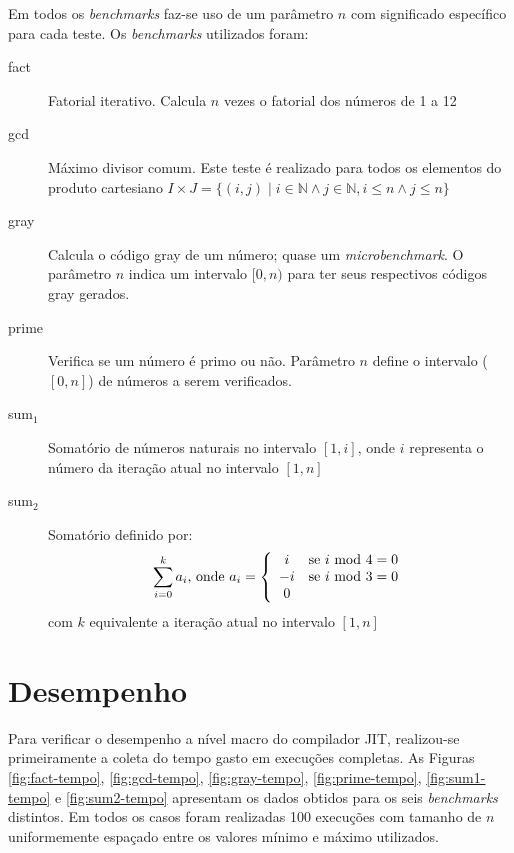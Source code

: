 Em todos os \textit{benchmarks} faz-se uso de um parâmetro $n$ com
significado específico para cada teste. Os \textit{benchmarks}
utilizados foram:

\begin{description}
\item[fact] Fatorial iterativo. Calcula $n$ vezes o fatorial dos
  números de 1 a 12
\item[gcd] Máximo divisor comum. Este teste é realizado
  para todos os elementos do produto cartesiano
 $I \times J = \{(i, j) \mid i \in \mathbb{N} \wedge j \in \mathbb{N},
 i \le n \wedge j \le n\}$
\item[gray] Calcula o código gray \cite{graycode} de um número;
  quase um \textit{microbenchmark}. O parâmetro $n$ indica um
  intervalo $[0, n)$ para ter seus respectivos códigos gray gerados.
\item[prime] Verifica se um número é primo ou não. Parâmetro $n$
  define o intervalo ($[0, n]$) de números a serem verificados.
\item[sum$_1$] Somatório de números naturais no intervalo
 $[1, i]$, onde $i$ representa o número da iteração atual no intervalo
 $[1, n]$
\item[sum$_2$] Somatório definido por:
\[ \sum_{i=0}^k a_i\mbox{, onde } a_i = \left\{
    \begin{array}{c l}
      i & \mbox{se } i \mbox{ mod } 4 = 0 \\
      -i & \mbox{se } i \mbox{ mod } 3 = 0 \\
      0
    \end{array}
  \right.
\] com $k$ equivalente a iteração atual no intervalo $[1, n]$
\end{description}


\section{Desempenho}

Para verificar o desempenho a nível macro do compilador JIT,
realizou-se primeiramente a coleta do tempo gasto em execuções
completas. As Figuras
\ref{fig:fact-tempo}, \ref{fig:gcd-tempo}, \ref{fig:gray-tempo},
\ref{fig:prime-tempo}, \ref{fig:sum1-tempo} e \ref{fig:sum2-tempo}
apresentam os dados obtidos para os seis \textit{benchmarks}
distintos. Em todos os casos foram realizadas 100 execuções com tamanho de
$n$ uniformemente espaçado entre os valores mínimo e máximo utilizados.

